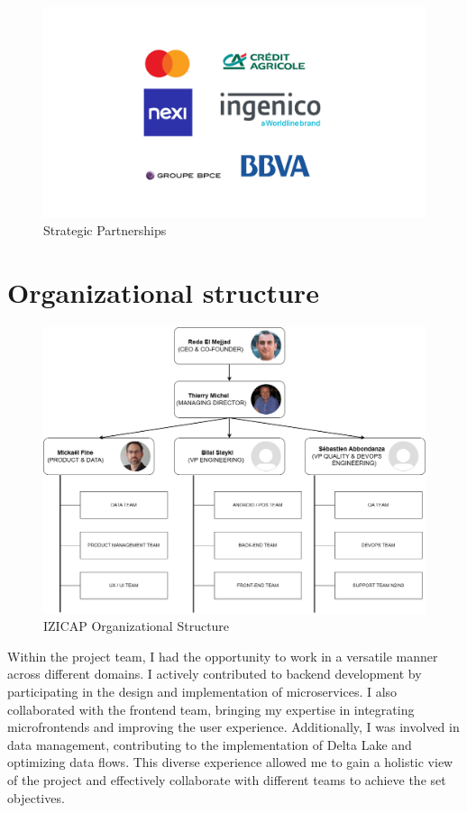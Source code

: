 \begin{figure}[H]
\centering
\includegraphics[width=\linewidth]{images/partenaires.png}
\caption{Strategic Partnerships}\label{fig:partnerships}
\end{figure}

\section{Organizational structure}
\begin{figure}[H]
\centering
\includegraphics[width=0.75\linewidth]{images/organigram.png}
\caption{IZICAP Organizational Structure}\label{fig:organigram}
\end{figure}

Within the project team, I had the opportunity to work in a versatile manner across different domains. I actively contributed to backend development by participating in the design and implementation of microservices. I also collaborated with the frontend team, bringing my expertise in integrating microfrontends and improving the user experience. Additionally, I was involved in data management, contributing to the implementation of Delta Lake and optimizing data flows. This diverse experience allowed me to gain a holistic view of the project and effectively collaborate with different teams to achieve the set objectives.

